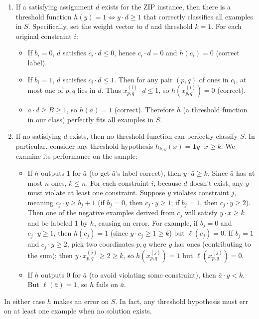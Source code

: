 \documentclass[11pt]{article}
\DeclareMathOperator{\1}{\mathbbm{1}}
\begin{document}
\begin{enumerate}
    \item If a satisfying assignment $d$ exists for the ZIP instance, then there is a threshold function $h(y) = 1 \iff y\cdot d \ge 1$ that correctly classifies all examples in $S$. Specifically, set the weight vector to $d$ and threshold $k=1$. For each original constraint $i$: \begin{itemize}
        \item If $b_i=0$, $d$ satisfies $c_i \cdot d \leq 0$, hence $c_i \cdot d = 0$ and $h(c_i) = 0$ (correct label).
        \item If $b_i=1$, $d$ satisfies $c_i\cdot d \le 1$. Then for any pair $(p,q)$ of ones in $c_i$, at most one of $p,q$ lies in $d$. Thus $x_{p,q}^{(i)}\cdot d \le 1$, so $h(x_{p,q}^{(i)})=0$ (correct).
        \item $\bar{a}\cdot d \ge B \ge 1$, so $h(\bar{a}) = 1$ (correct). Therefore $h$ (a threshold function in our class) perfectly fits all examples in $S$.
    \end{itemize}
    \item If no satisfying $d$ exists, then no threshold function can perfectly classify $S$. In particular, consider any threshold hypothesis $h_{k,y}(x) = \mathbf{1}{y\cdot x \ge k}$. We examine its performance on the sample: \begin{itemize}
        \item If $h$ outputs 1 for $\bar{a}$ (to get $\bar{a}$’s label correct), then $y\cdot \bar{a} \ge k$. Since $\bar{a}$ has at most $n$ ones, $k \le n$. For each constraint $i$, because $d$ doesn’t exist, any $y$ must violate at least one constraint. Suppose $y$ violates constraint $j$, meaning $c_j\cdot y \ge b_j+1$ (if $b_j=0$, then $c_j\cdot y \ge 1$; if $b_j=1$, then $c_j\cdot y \ge 2$). Then one of the negative examples derived from $c_j$ will satisfy $y\cdot x \ge k$ and be labeled 1 by $h$, causing an error. For example, if $b_j=0$ and $c_j\cdot y \ge 1$, then $h(c_j)=1$ (since $y\cdot c_j \ge 1 \ge k$) but $\ell(c_j)=0$. If $b_j=1$ and $c_j\cdot y \ge 2$, pick two coordinates $p,q$ where $y$ has ones (contributing to the sum); then $y \cdot x_{p,q}^{(j)} \ge 2 \ge k$, so $h(x_{p,q}^{(j)})=1$ but $\ell(x_{p,q}^{(j)})=0$.
        \item If $h$ outputs 0 for $\bar{a}$ (to avoid violating some constraint), then $\bar{a}\cdot y < k$. But $\ell(\bar{a})=1$, so $h$ fails on $\bar{a}$.
    \end{itemize}
\end{enumerate}
In either case $h$ makes an error on $S$. In fact, any threshold hypothesis must err on at least one example when no solution exists.
\end{document}
